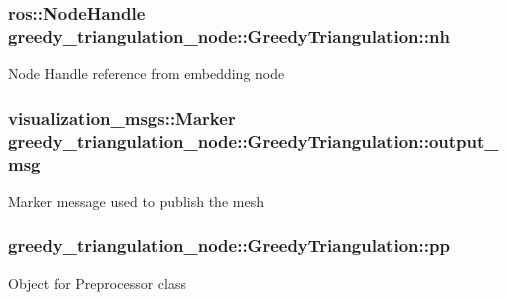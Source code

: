 \subsubsection[{\texorpdfstring{nh}{nh}}]{\setlength{\rightskip}{0pt plus 5cm}ros\+::\+Node\+Handle greedy\+\_\+triangulation\+\_\+node\+::\+Greedy\+Triangulation\+::nh\hspace{0.3cm}{\ttfamily [private]}}\hypertarget{classgreedy__triangulation__node_1_1_greedy_triangulation_a33c0f88cc59f8eb2bf5e09382a65e991}{}\label{classgreedy__triangulation__node_1_1_greedy_triangulation_a33c0f88cc59f8eb2bf5e09382a65e991}
Node Handle reference from embedding node 
\subsubsection[{\texorpdfstring{output\+\_\+msg}{output_msg}}]{\setlength{\rightskip}{0pt plus 5cm}visualization\+\_\+msgs\+::\+Marker greedy\+\_\+triangulation\+\_\+node\+::\+Greedy\+Triangulation\+::output\+\_\+msg\hspace{0.3cm}{\ttfamily [private]}}\hypertarget{classgreedy__triangulation__node_1_1_greedy_triangulation_a87417732cd72c77cce60c58dc0a39076}{}\label{classgreedy__triangulation__node_1_1_greedy_triangulation_a87417732cd72c77cce60c58dc0a39076}
Marker message used to publish the mesh 
\subsubsection[{\texorpdfstring{pp}{pp}}]{ greedy\+\_\+triangulation\+\_\+node\+::\+Greedy\+Triangulation\+::pp\hspace{0.3cm}{\ttfamily [private]}}\hypertarget{classgreedy__triangulation__node_1_1_greedy_triangulation_acfff8052bccf50852690aef57800a443}{}\label{classgreedy__triangulation__node_1_1_greedy_triangulation_acfff8052bccf50852690aef57800a443}
Object for Preprocessor class 
